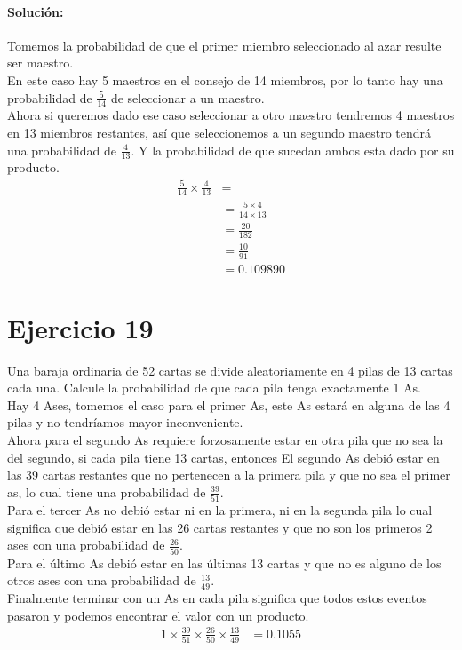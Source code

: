 \documentclass[12pt]{article}
\begin{document}
\paragraph{Solución: } Tomemos la probabilidad de que el primer miembro seleccionado al azar resulte ser maestro.\\
En este caso hay 5 maestros en el consejo de 14 miembros, por lo tanto hay una probabilidad de $\frac{5}{14}$ de seleccionar a un maestro.\\
Ahora si queremos dado ese caso seleccionar a otro maestro tendremos 4 maestros en 13 miembros restantes, así que seleccionemos a un segundo maestro tendrá una probabilidad de $\frac{4}{13}$.
Y la probabilidad de que sucedan ambos esta dado por su producto.\\
\begin{equation}
	\begin{split}
	\frac{5}{14} \times \frac{4}{13}&=\\
	&=\frac{5\times 4}{14 \times 13} \\
	&=\frac{20}{182} \\
	&=\frac{10}{91}\\
	&= 0.109890
	\end{split}
\end{equation}
\section{Ejercicio 19}
Una baraja ordinaria de 52 cartas se divide aleatoriamente en 4 pilas de 13 cartas cada una.
Calcule la probabilidad de que cada pila tenga exactamente 1 As.\\
Hay 4 Ases, tomemos el caso para el primer As, este As estará en alguna de las 4 pilas y no tendríamos mayor inconveniente.\\
Ahora para el segundo As requiere forzosamente estar en otra pila que no sea la del segundo, si cada pila tiene 13 cartas, entonces El segundo As debió estar en las 39 cartas restantes que no pertenecen a la primera pila y que no sea el primer as, lo cual tiene una probabilidad de $\frac{39}{51}$.\\
Para el tercer As no debió estar ni en la primera, ni en la segunda pila lo cual significa que debió estar en las 26 cartas restantes y que no son los primeros 2 ases con una probabilidad de $\frac{26}{50}$.\\
Para el último As debió estar en las últimas 13 cartas y que no es alguno de los otros ases con una probabilidad de $\frac{13}{49}$.\\
Finalmente terminar con un As en cada pila significa que todos estos eventos pasaron y podemos encontrar el valor con un producto.
\begin{equation}
\begin{split}
	1 \times \frac{39}{51} \times \frac{26}{50} \times \frac{13}{49} &= 0.1055\\	
\end{split}
\end{equation}
\end{document}
